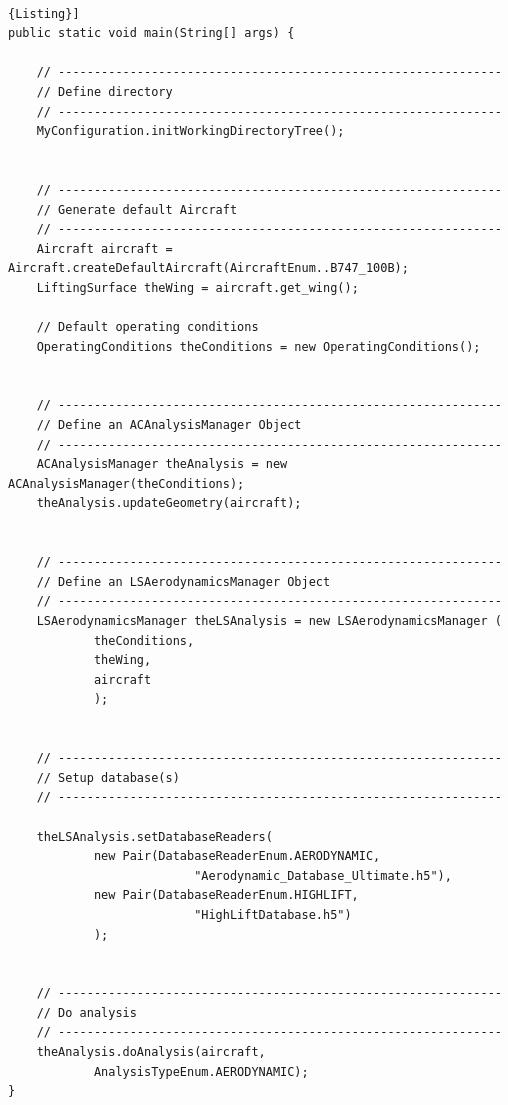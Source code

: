 \noindent \\
\begin{lstlisting}[frame=rbl,caption={{\footnotesize Generation of default aircraft}},label= [style=\bfseries]{Listing}]
public static void main(String[] args) {

	// --------------------------------------------------------------
	// Define directory
	// --------------------------------------------------------------
	MyConfiguration.initWorkingDirectoryTree();


	// --------------------------------------------------------------
	// Generate default Aircraft
	// --------------------------------------------------------------
	Aircraft aircraft = Aircraft.createDefaultAircraft(AircraftEnum..B747_100B);
	LiftingSurface theWing = aircraft.get_wing();

	// Default operating conditions
	OperatingConditions theConditions = new OperatingConditions();		


	// --------------------------------------------------------------
	// Define an ACAnalysisManager Object
	// --------------------------------------------------------------
	ACAnalysisManager theAnalysis = new ACAnalysisManager(theConditions);
	theAnalysis.updateGeometry(aircraft);


	// --------------------------------------------------------------
	// Define an LSAerodynamicsManager Object
	// --------------------------------------------------------------
	LSAerodynamicsManager theLSAnalysis = new LSAerodynamicsManager ( 
			theConditions,
			theWing,
			aircraft
			);

		
	// --------------------------------------------------------------
	// Setup database(s)	
	// --------------------------------------------------------------
		
	theLSAnalysis.setDatabaseReaders(
			new Pair(DatabaseReaderEnum.AERODYNAMIC,
                          "Aerodynamic_Database_Ultimate.h5"),
			new Pair(DatabaseReaderEnum.HIGHLIFT,  
                          "HighLiftDatabase.h5")
			);

	
	// --------------------------------------------------------------
	// Do analysis
	// --------------------------------------------------------------
	theAnalysis.doAnalysis(aircraft, 
			AnalysisTypeEnum.AERODYNAMIC);
}
\end{lstlisting}

